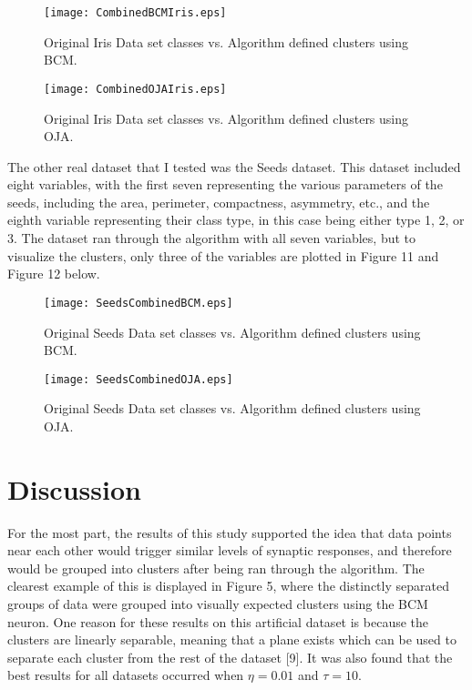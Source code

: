 \documentclass[10pt,twoside]{article}
\begin{document}
\begin{figure}[H]\small\centering\label{fig9}
\texttt{[image: CombinedBCMIris.eps]}
\caption{Original Iris Data set classes vs. Algorithm defined clusters using BCM.}
\end{figure}


\begin{figure}[H]\small\centering\label{fig10}
\texttt{[image: CombinedOJAIris.eps]}
\caption{Original Iris Data set classes vs. Algorithm defined clusters using OJA.}
\end{figure}

The other real dataset that I tested was the Seeds dataset. This dataset included eight variables, with the first seven representing the
various parameters of the seeds, including the area, perimeter, compactness, asymmetry, etc.,
and the eighth variable representing their class type, in this case being either type 1, 2, or 3. The dataset ran through the algorithm
with all seven variables, but to visualize the clusters, only three of the variables are plotted in Figure 11 and Figure 12 below.

\begin{figure}[H]\small\centering\label{fig11}
\texttt{[image: SeedsCombinedBCM.eps]}
\caption{Original Seeds Data set classes vs. Algorithm defined clusters using BCM.}
\end{figure}

\begin{figure}[H]\small\centering\label{fig12}
\texttt{[image: SeedsCombinedOJA.eps]}
\caption{Original Seeds Data set classes vs. Algorithm defined clusters using OJA.}
\end{figure}


\section*{\centering  Discussion}

For the most part, the results of this study supported the idea that data points near each other would trigger similar levels 
of synaptic responses, and therefore would be grouped into clusters after being ran through the algorithm. The clearest example of this
is displayed in Figure 5, where the distinctly separated groups of data were grouped into visually expected clusters using the BCM neuron. 
One reason for these results on this artificial dataset is because the clusters are linearly separable,
meaning that a plane exists which can be used to separate each cluster from the rest of the dataset [9]. It was also found that the best results for
all datasets occurred when $\eta = 0.01$ and $\tau = 10$.
\end{document}
